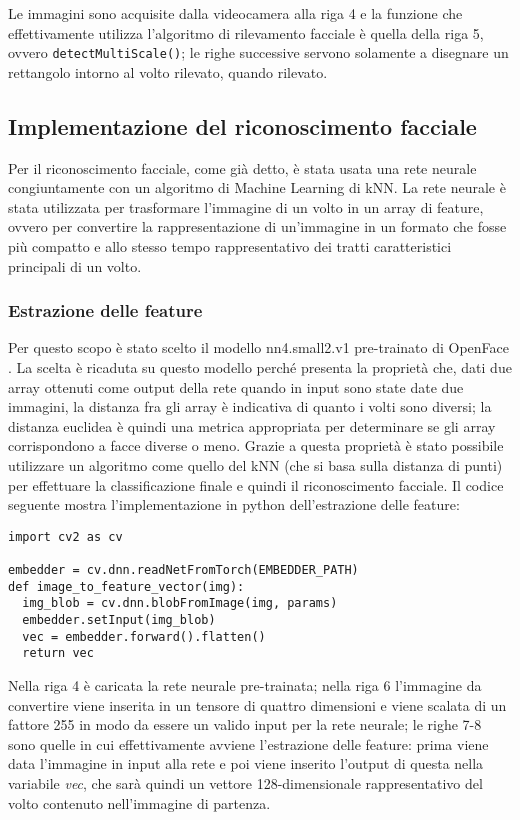 Le immagini sono acquisite dalla videocamera alla riga 4 e la funzione che effettivamente utilizza l'algoritmo di rilevamento facciale è quella della riga 5, ovvero \texttt{detectMultiScale()}; le righe successive servono solamente a disegnare un rettangolo intorno al volto rilevato, quando rilevato. 

\subsection{Implementazione del riconoscimento facciale}
Per il riconoscimento facciale, come già detto, è stata usata una rete neurale congiuntamente con un algoritmo di Machine Learning di kNN. La rete neurale è stata utilizzata per trasformare l'immagine di un volto in un array di feature, ovvero per convertire la rappresentazione di un'immagine in un formato che fosse più compatto e allo stesso tempo rappresentativo dei tratti caratteristici principali di un volto. 

\subsubsection{Estrazione delle feature}
Per questo scopo è stato scelto il modello nn4.small2.v1 pre-trainato di OpenFace \cite{amos2016openface}. La scelta è ricaduta su questo modello perché presenta la proprietà che, dati due array ottenuti come output della rete quando in input sono state date due immagini, la distanza fra gli array è indicativa di quanto i volti sono diversi; la distanza euclidea è quindi una metrica appropriata per determinare se gli array corrispondono a facce diverse o meno. Grazie a questa proprietà è stato possibile utilizzare un algoritmo come quello del kNN (che si basa sulla distanza di punti) per effettuare la classificazione finale e quindi il riconoscimento facciale. Il codice seguente mostra l'implementazione in python dell'estrazione delle feature:

\begin{lstlisting}
import cv2 as cv 

embedder = cv.dnn.readNetFromTorch(EMBEDDER_PATH)
def image_to_feature_vector(img):
  img_blob = cv.dnn.blobFromImage(img, params)
  embedder.setInput(img_blob)
  vec = embedder.forward().flatten()
  return vec
\end{lstlisting}


Nella riga 4 è caricata la rete neurale pre-trainata; nella riga 6 l'immagine da convertire viene inserita in un tensore di quattro dimensioni e viene scalata di un fattore 255 in modo da essere un valido input per la rete neurale; le righe 7-8 sono quelle in cui effettivamente avviene l'estrazione delle feature: prima viene data l'immagine in input alla rete e poi viene inserito l'output di questa nella variabile \textit{vec}, che sarà quindi un vettore 128-dimensionale rappresentativo del volto contenuto nell'immagine di partenza.

